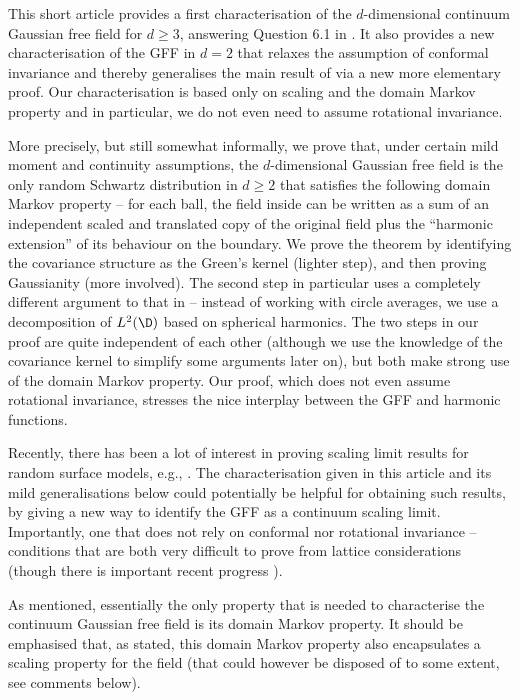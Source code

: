 \documentclass[JEP,XML,SOM,Unicode,published]{cedram}
\theoremstyle{definition}
\begin{document}
This short article provides a first characterisation of the $d$-dimensional continuum Gaussian free field for $d \geq 3$, answering Question 6.1 in \cite{BPR18}. It also provides a new characterisation of the GFF in $d= 2$ that relaxes the assumption of conformal invariance and {thereby generalises the main result of \cite{BPR18} via a new {more elementary} proof}. Our characterisation is based only on {scaling} and the domain Markov property and in particular, we do not even need to assume rotational invariance.

More precisely, but still somewhat informally, we prove that, under certain mild moment and continuity assumptions, the $d$-dimensional Gaussian free field is the only random Schwartz distribution in $d \geq 2$ that satisfies the following domain Markov property -- for each ball, the field inside can be written as a sum of an independent scaled and translated copy of the original field plus the ``harmonic extension'' of its behaviour on the boundary. We prove the theorem by identifying the covariance structure as the Green's kernel (lighter step), and then proving Gaussianity (more involved). The second step in particular uses a completely different argument to that in \cite{BPR18} -- {instead of working with circle averages, we use a decomposition of $L^2(\D)$ based on spherical harmonics}. The two steps in our proof are quite independent of each other (although we use the knowledge of the covariance kernel to simplify some arguments later on), but both make strong use of the domain Markov property. Our proof, which does not even assume rotational invariance, stresses the nice interplay between the GFF and harmonic functions.

Recently, there has been a lot of interest in proving scaling limit results for random surface models, e.g., \cite{SquareIce,BLRsurface, GM21}. The characterisation given in this article {and its mild generalisations below} could potentially be helpful for obtaining such results, by giving a new way to identify the GFF as a continuum scaling limit. Importantly, one that does not rely on conformal nor rotational invariance -- conditions that are both very difficult to prove from lattice considerations (though there is important recent progress \cite{mano}).

As mentioned, essentially the only property that is needed to characterise the continuum Gaussian free field is its domain Markov property. It should be emphasised that, as stated, this domain Markov property also encapsulates a scaling property for the field (that could however be disposed of to some extent, see comments below).\enlargethispage{.5\baselineskip}%
\end{document}
